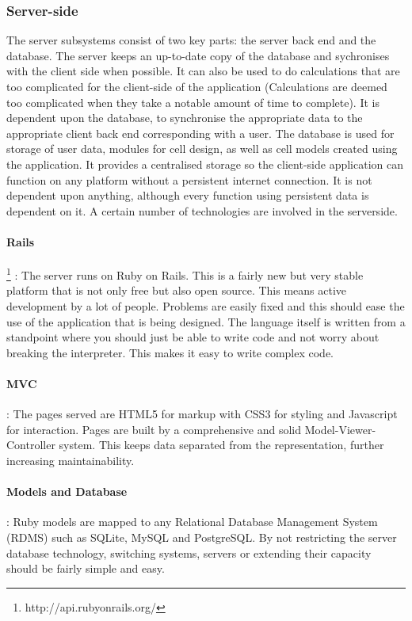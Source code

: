 \documentclass{report}
\begin{document}
			\subsubsection{Server-side}
				The server subsystems consist of two key parts: the server back end and the database. The server keeps an up-to-date copy of the database and sychronises with the client side when possible. It can also be used to do calculations that are too complicated for the client-side of the application (Calculations are deemed too complicated when they take a notable amount of time to complete). It is dependent upon the database, to synchronise the appropriate data to the appropriate client back end corresponding with a user.
				The database is used for storage of user data, modules for cell design, as well as cell models created using the application. It provides a centralised storage so the client-side application can function on any platform without a persistent internet connection. It is not dependent upon anything, although every function using persistent data is dependent on it. 
				A certain number of technologies are involved in the serverside.
				\paragraph{Rails}\footnote{http://api.rubyonrails.org/}
					: The server runs on Ruby on Rails. This is a fairly new but very stable platform that is not only free but also open source. This means active development by a lot of people. Problems are easily fixed and this should ease the use of the application that is being designed. The language itself is written from a standpoint where you should just be able to write code and not worry about breaking the interpreter. This makes it easy to write complex code.
				\paragraph{MVC}
					: The pages served are HTML5 for markup with CSS3 for styling and Javascript for interaction. Pages are built by a comprehensive and solid Model-Viewer-Controller system. This keeps data separated from the representation, further increasing maintainability. 
				\paragraph{Models and Database}
					: Ruby models are mapped to any Relational Database Management System (RDMS) such as SQLite, MySQL and PostgreSQL. By not restricting the server database technology, switching systems, servers or extending  their capacity should be fairly simple and easy.
\end{document}
